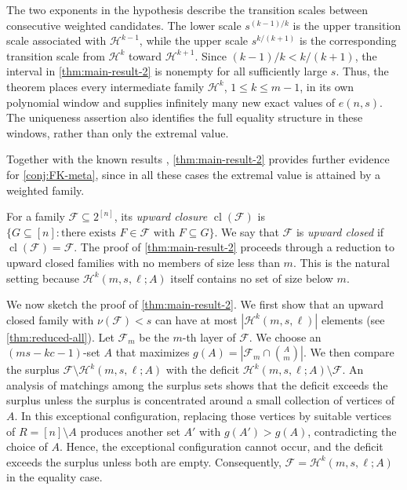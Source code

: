 \documentclass[10pt,a4paper]{article}
\numberwithin{equation}{section}
\theoremstyle{definition}
\newcommand{\F}{\mathcal F}
\newcommand{\cl}{\operatorname{cl}}
\begin{document}
The two exponents in the hypothesis describe the transition scales between consecutive weighted candidates.
The lower scale $s^{(k-1)/k}$ is the upper transition scale associated with $\mathcal H^{k-1}$, while the upper scale $s^{k/(k+1)}$ is the corresponding transition scale from $\mathcal H^k$ toward $\mathcal H^{k+1}$.
Since $(k-1)/k<k/(k+1)$, the interval in \cref{thm:main-result-2} is nonempty for all sufficiently large $s$.
Thus, the theorem places every intermediate family $\mathcal H^k$, $1\le k\le m-1$, in its own polynomial window and supplies infinitely many new exact values of $e(n,s)$.
The uniqueness assertion also identifies the full equality structure in these windows, rather than only the extremal value.

Together with the known results \cite{ChiWangK1,ChiWangK2,KupavskiiSokolovComplete,KupavskiiSokolovOtherEnd,KupavskiiSokolovMore}, \cref{thm:main-result-2} provides further evidence for \cref{conj:FK-meta}, since in all these cases the extremal value is attained by a weighted family.

For a family $\F\subseteq2^{[n]}$, its \emph{upward closure} $\cl(\F)$ is $\{G\subseteq[n]:\text{there exists }F\in\F\text{ with }F\subseteq G\}$.
We say that $\F$ is \emph{upward closed} if $\cl(\F)=\F$.
The proof of \cref{thm:main-result-2} proceeds through a reduction to upward closed families with no members of size less than $m$.
This is the natural setting because $\mathcal H^k(m,s,\ell;A)$ itself contains no set of size below $m$.

We now sketch the proof of \cref{thm:main-result-2}.
We first show that an upward closed family with $\nu(\F)<s$ can have at most $|\mathcal H^k(m,s,\ell)|$ elements (see \cref{thm:reduced-all}).
Let $\F_m$ be the $m$-th layer of $\F$.
We choose an $(ms-kc-1)$-set $A$ that maximizes $g(A)=|\F_m\cap\binom Am|$.
We then compare the surplus $\F\setminus\mathcal H^k(m,s,\ell;A)$ with the deficit $\mathcal H^k(m,s,\ell;A)\setminus\F$.
An analysis of matchings among the surplus sets shows that the deficit exceeds the surplus unless the surplus is concentrated around a small collection of vertices of $A$.
In this exceptional configuration, replacing those vertices by suitable vertices of $R=[n]\setminus A$ produces another set $A'$ with $g(A')>g(A)$, contradicting the choice of $A$.
Hence, the exceptional configuration cannot occur, and the deficit exceeds the surplus unless both are empty. Consequently, $\F=\mathcal H^k(m,s,\ell;A)$ in the equality case.
\end{document}
